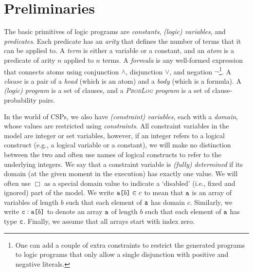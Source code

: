 \documentclass[runningheads]{llncs}
\newcommand{\variable}[1]{\texttt{\textup{#1}}}
\newcommand{\arrayd}[3]{\variable{{#1}[}{#2}\variable{]} \in {#3}}
\newcommand{\arrayt}[3]{\variable{{#3}} : \variable{{#1}[}{#2}\variable{]}}
\begin{document}
\section{Preliminaries}

The basic primitives of logic programs are \emph{constants}, \emph{(logic)
  variables}, and \emph{predicates}. Each predicate has an \emph{arity} that
defines the number of terms that it can be applied to. A \emph{term} is either a
variable or a constant, and an \emph{atom} is a predicate of arity $n$ applied
to $n$ terms. A \emph{formula} is any well-formed expression that connects
atoms using conjunction $\land$, disjunction $\lor$, and negation
$\neg$\footnote{One can add a couple of extra constraints to restrict the
  generated programs to logic programs that only allow a single disjunction with
  positive and negative literals.}.
A \emph{clause} is a pair of a \emph{head} (which is an atom) and a \emph{body}
(which is a formula). A \emph{(logic) program} is a set of clauses, and a
\emph{\textsc{ProbLog} program} is a set of clause-probability pairs.

In the world of CSPs, we also have \emph{(constraint) variables}, each with a
\emph{domain}, whose values are restricted using \emph{constraints}. All
constraint variables in the model are integer or set variables, however, if an
integer refers to a logical construct (e.g., a logical variable or a constant),
we will make no distinction between the two and often use names of logical
constructs to refer to the underlying integers. We say that a constraint
variable is \emph{(fully) determined} if its domain (at the given moment in the
execution) has exactly one value. We will often use $\Box$ as a special domain
value to indicate a `disabled' (i.e., fixed and ignored) part of the model. We
write $\arrayd{a}{b}{c}$ to mean that $\variable{a}$ is an array of variables of
length $b$ such that each element of $\variable{a}$ has domain $c$. Similarly,
we write $\arrayt{a}{b}{c}$ to denote an array $\variable{a}$ of length $b$ such
that each element of $\variable{a}$ has type $\variable{c}$. Finally, we assume
that all arrays start with index zero.
\end{document}
